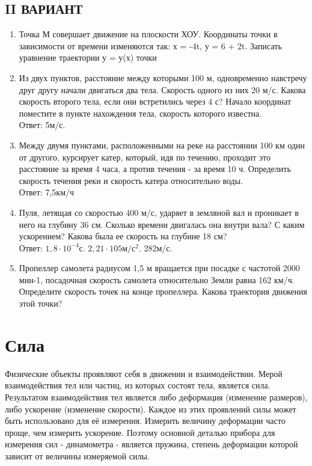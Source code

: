 \documentclass[a5paper, 10pt]{diss_4}
\renewcommand{\'}{\,'}
\begin{document}
\subsection{II ВАРИАНТ}
\begin{enumerate}
\item Точка М совершает движение на плоскости ХОУ. Координаты точки в зависимости от времени изменяются так: х = -4t, у = 6 + 2t. Записать уравнение траектории у = у(х) точки
\item Из двух пунктов, расстояние между которыми 100 м, одновременно навстречу друг другу начали двигаться два тела. Скорость одного из них 20 м/с. Какова скорость второго тела, если они встретились через 4 с? Начало координат поместите в пункте нахождения тела, скорость которого известна.
\\ Ответ: 5м/с.

\item Между двумя пунктами, расположенными на реке на расстоянии 100 км один от другого, курсирует катер, который, идя по течению, проходит это расстояние за время 4 часа, а против течения - за время 10 ч. Определить скорость течения реки и скорость катера относительно воды.
\\ Ответ: 7,5км/ч
\item Пуля, летящая со скоростью 400 м/с, ударяет в земляной вал и проникает в него на глубину 36 см. Сколько времени двигалась она внутри вала? С каким ускорением? Какова была ее скорость на глубине 18 см?
\\ Ответ: $1,8\cdot 10^{-4}с$.  $2,21\cdot 105м/с^2$.  282м/с.
\item Пропеллер самолета радиусом 1,5 м вращается при посадке с частотой 2000 мин-1, посадочная скорость самолета относительно Земли равна 162 км/ч. Определите скорость точек на конце пропеллера. Какова траектория движения этой точки?
\end{enumerate}

\section{Сила}

  Физические объекты проявляют себя в движении и взаимодействии. Мерой
взаимодействия тел или частиц, из которых состоят тела, является сила.
Результатом взаимодействия тел является либо деформация (изменение размеров),
либо ускорение (изменение скорости). Каждое из этих проявлений силы может быть
использовано для её измерения. Измерить величину деформации часто проще, чем
измерить ускорение. Поэтому основной деталью прибора для измерения сил -
динамометра - является пружина, степень деформации которой зависит от величины
измеряемой силы.
\end{document}
